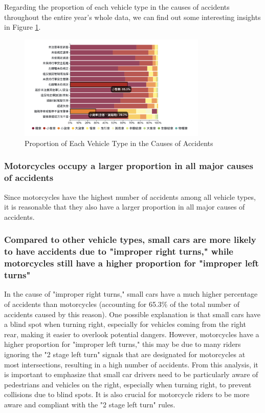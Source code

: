 \documentclass[a4paper, oneside, final, 12pt]{scrartcl} %
\begin{document}
Regarding the proportion of each vehicle type in the 
causes of accidents throughout the entire year's whole data,
we can find out some interesting insights in Figure \ref{fig: insight_cause}.

\begin{figure}[htbp]
  \centering
  \includegraphics[width=0.8\textwidth]{"./Image/insight_stacked.png"}
  \caption{Proportion of Each Vehicle Type in the Causes of Accidents}
  \label{fig: insight_cause}
\end{figure}

\subsubsection{Motorcycles occupy a larger proportion in all major causes of accidents}

Since motorcycles have the highest number of accidents among all vehicle types, 
it is reasonable that they also have a larger proportion in all major causes of accidents.

\subsubsection{Compared to other vehicle types, 
small cars are more likely to have accidents due to 
"improper right turns," while motorcycles still have a higher 
proportion for "improper left turns"}

In the cause of "improper right turns," small cars have a much higher 
percentage of accidents than motorcycles 
(accounting for 65.3\% of the total number of accidents caused by this reason). 
One possible explanation is that small cars have a blind spot when turning right, 
especially for vehicles coming from the right rear, making it easier to 
overlook potential dangers. However, motorcycles have a higher proportion for 
"improper left turns," this may be due to many riders ignoring the "2 stage left turn" 
signals that are designated for motorcycles at most intersections, 
resulting in a high number of accidents. From this analysis, 
it is important to emphasize that small car drivers need to be 
particularly aware of pedestrians and vehicles on the right, 
especially when turning right, to prevent collisions due to blind spots. 
It is also crucial for motorcycle riders to be more aware and compliant 
with the "2 stage left turn" rules.
\end{document}
